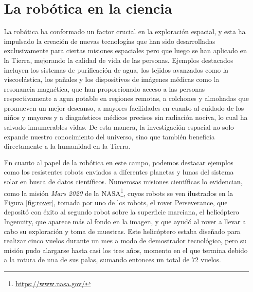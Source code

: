 \section{La robótica en la ciencia}
\label{sec:exploracion_espacial} %

La robótica ha conformado un factor crucial en la exploración espacial, y esta
ha impulsado la creación de nuevas tecnologías que han sido desarrolladas
exclusivamente para ciertas misiones espaciales pero que luego se han aplicado
en la Tierra, mejorando la calidad de vida de las personas.
Ejemplos destacados incluyen los sistemas de purificación de agua, los tejidos
avanzados como la viscoelástica, los pañales y los dispositivos de imágenes
médicas como la resonancia magnética, que han proporcionado acceso a las
personas respectivamente a agua potable en regiones remotas, a colchones y
almohadas que promueven un mejor descanso, a mayores facilidades en cuanto al
cuidado de los niños y mayores y a diagnósticos médicos precisos sin radiación
nociva, lo cual ha salvado innumerables vidas.
De esta manera, la investigación espacial no solo expande nuestro conocimiento
del universo, sino que también beneficia directamente a la humanidad en la
Tierra.

En cuanto al papel de la robótica en este campo, podemos destacar ejemplos como
los resistentes robots enviados a diferentes planetas y lunas del sistema solar
en busca de datos científicos.
Numerosas misiones científicas lo evidencian, como la misión \textit{Mars 2020}
de la NASA\footnote{\url{https://www.nasa.gov/}}, cuyos robots se ven ilustrados
en la Figura \ref{fig:rover}, tomada por uno de los robots, el rover
Perseverance, que depositó con éxito al segundo robot sobre la superficie
marciana, el helicóptero Ingenuity, que aparece más al fondo en la imagen, y que
ayudó al rover a llevar a cabo su exploración y toma de muestras.
Este helicóptero estaba diseñado para realizar cinco vuelos durante un mes a
modo de demostrador tecnológico, pero su misión pudo alargarse hasta casi los
tres años, momento en el que termina debido a la rotura de una de sus palas,
sumando entonces un total de 72 vuelos.

